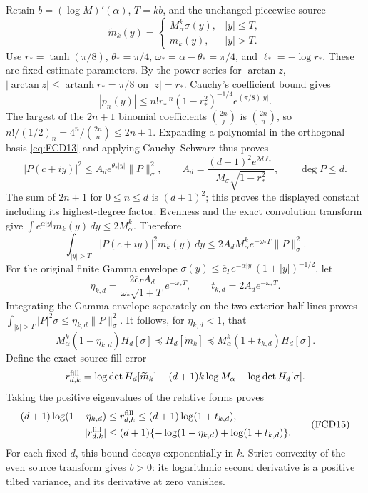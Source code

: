 \documentclass[11pt]{article}
\begin{document}
Retain \(b=(\log M)'(\alpha)\), \(T=kb\), and the unchanged
piecewise source
\[
 \widetilde m_k(y)=
 \begin{cases}M_\alpha^k\sigma(y),&|y|\le T,\\
 m_k(y),&|y|>T.
 \end{cases}
\]
Use \(r_*=\tanh(\pi/8)\), \(\theta_*=\pi/4\),
\(\omega_*=\alpha-\theta_*=\pi/4\), and
\(\ell_*=-\log r_*\). These are fixed estimate parameters.
By the power series for \(\arctan z\),
\(|\arctan z|\le\operatorname{artanh}r_*=\pi/8\) on \(|z|=r_*\).
Cauchy's coefficient bound gives
\[
 |p_n(y)|\le n!r_*^{-n}(1-r_*^2)^{-1/4}
                                    e^{(\pi/8)|y|}.
\]
The largest of the \(2n+1\) binomial coefficients
\(\binom{2n}{j}\) is \(\binom{2n}{n}\), so
\(n!/(1/2)_n=4^n/\binom{2n}{n}\le2n+1\).
Expanding a polynomial in the orthogonal basis \eqref{eq:FCD13}
and applying Cauchy--Schwarz thus proves
\[
 |P(c+iy)|^2\le A_d e^{\theta_*|y|}\|P\|_\sigma^2,\qquad
 A_d=\frac{(d+1)^2e^{2d\ell_*}}
             {M_\sigma\sqrt{1-r_*^2}},
       \qquad \deg P\le d .
\]
The sum of \(2n+1\) for \(0\le n\le d\) is \((d+1)^2\);
this proves the displayed constant including its highest-degree factor.
Evenness and the exact convolution transform give
\(\int e^{\alpha|y|}m_k(y)\,dy\le2M_\alpha^k\).
Therefore
\[
 \int_{|y|>T}|P(c+iy)|^2m_k(y)\,dy
  \le2A_dM_\alpha^ke^{-\omega_*T}\|P\|_\sigma^2 .
\]
For the original finite Gamma envelope
\(\sigma(y)\le\overline c_\Gamma
e^{-\alpha|y|}(1+|y|)^{-1/2}\), let
\[
 \eta_{k,d}=\frac{2\overline c_\Gamma A_d}
                 {\omega_*\sqrt{1+T}}e^{-\omega_*T},
 \qquad t_{k,d}=2A_de^{-\omega_*T}.
\]
Integrating the Gamma envelope separately on the two exterior half-lines
proves
\(\int_{|y|>T}|P|^2\sigma\le\eta_{k,d}\|P\|_\sigma^2\).
It follows, for \(\eta_{k,d}<1\), that
\[
 M_\alpha^k(1-\eta_{k,d})H_d[\sigma]
  \preceq H_d[\widetilde m_k]
  \preceq M_\alpha^k(1+t_{k,d})H_d[\sigma].
\]
Define the exact source-fill error
\[
 r_{d,k}^{\rm fill}
   =\log\det H_d[\widetilde m_k]
        -(d+1)k\log M_\alpha-\log\det H_d[\sigma].
\]
Taking the positive eigenvalues of the relative forms proves
\begin{equation}
 \begin{split}
 (d+1)\log(1-\eta_{k,d})
       &\le r_{d,k}^{\rm fill}
                 \le(d+1)\log(1+t_{k,d}),\\
 |r_{d,k}^{\rm fill}|
       &\le(d+1)\{-\log(1-\eta_{k,d})+\log(1+t_{k,d})\}.
 \end{split}
 \tag{FCD15}\label{eq:FCD15}
\end{equation}
For each fixed \(d\), this bound decays exponentially in \(k\).
Strict convexity of the even source transform gives \(b>0\):
its logarithmic second derivative is a positive tilted variance, and
its derivative at zero vanishes.
\end{document}
